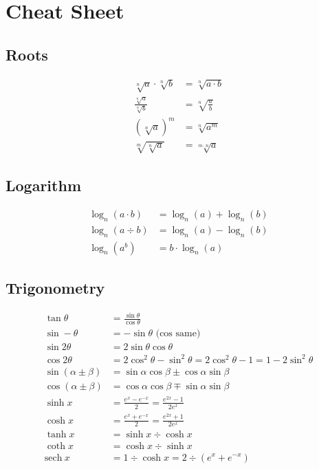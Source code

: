 \section{Cheat Sheet}
\subsection{Roots}

\begin{align*}
	\sqrt[n]{a}\cdot\sqrt[n]{b} & = \sqrt[n]{a\cdot b} \\
	\frac{\sqrt[n]{a}}{\sqrt[n]{b}} & = \sqrt[n]{\frac{a}{b}} \\
	(\sqrt[n]{a})^m & = \sqrt[n]{a^m} \\
	\sqrt[m]{\sqrt[n]{a}} & = \sqrt[m\cdot n]{a}
\end{align*}


\subsection{Logarithm}

\begin{align*}
	\log_n(a\cdot b) & = \log_n(a) + \log_n(b) \\
	\log_n(a\div b) & = \log_n(a) - \log_n(b) \\
	\log_n(a^b) & = b \cdot \log_n(a)
\end{align*}

\subsection{Trigonometry}

\begin{align*}
	\tan\theta & = \frac{\sin\theta}{\cos\theta} \\
	\sin -\theta & = -\sin\theta\text{ (cos same)} \\
	\sin 2\theta & = 2\sin\theta\cos\theta \\
	\cos 2\theta & = 2\cos^2\theta - \sin^2\theta = 2\cos^2\theta - 1 = 1 - 2\sin^2\theta \\
	\sin(\alpha \pm \beta) & = \sin\alpha\cos\beta\pm\cos\alpha\sin\beta \\
	\cos(\alpha\pm\beta) & = \cos\alpha\cos\beta \mp \sin\alpha\sin\beta \\
	\sinh x & = \frac{e^x - e^{-x}}{2}=\frac{e^{2x}-1}{2e^x} \\
	\cosh x & = \frac{e^x + e^{-x}}{2} = \frac{e^{2x}+1}{2e^x} \\
	\tanh x & = \sinh x \div \cosh x \\
	\coth x & = \cosh x \div \sinh x \\
	\mathrm{sech}\ x & = 1 \div \cosh x = 2 \div (e^x+e^{-x})
\end{align*}

